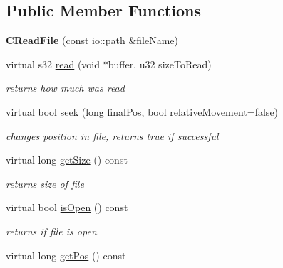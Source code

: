 \subsection*{Public Member Functions}
\begin{DoxyCompactItemize}
\item 
\hypertarget{classirr_1_1io_1_1_c_read_file_aff2d711645b645dbce0ad20aefcb1933}{{\bfseries C\-Read\-File} (const io\-::path \&file\-Name)}\label{classirr_1_1io_1_1_c_read_file_aff2d711645b645dbce0ad20aefcb1933}

\item 
\hypertarget{classirr_1_1io_1_1_c_read_file_a94aab546e88a21f5edc556ca9aea567f}{virtual s32 \hyperlink{classirr_1_1io_1_1_c_read_file_a94aab546e88a21f5edc556ca9aea567f}{read} (void $\ast$buffer, u32 size\-To\-Read)}\label{classirr_1_1io_1_1_c_read_file_a94aab546e88a21f5edc556ca9aea567f}

\begin{DoxyCompactList}\small\item\em returns how much was read \end{DoxyCompactList}\item 
virtual bool \hyperlink{classirr_1_1io_1_1_c_read_file_a56b92b55be46710dddd67e74460531e2}{seek} (long final\-Pos, bool relative\-Movement=false)
\begin{DoxyCompactList}\small\item\em changes position in file, returns true if successful \end{DoxyCompactList}\item 
\hypertarget{classirr_1_1io_1_1_c_read_file_a5df24d6a44fce05960c2b7e5887b4fc3}{virtual long \hyperlink{classirr_1_1io_1_1_c_read_file_a5df24d6a44fce05960c2b7e5887b4fc3}{get\-Size} () const }\label{classirr_1_1io_1_1_c_read_file_a5df24d6a44fce05960c2b7e5887b4fc3}

\begin{DoxyCompactList}\small\item\em returns size of file \end{DoxyCompactList}\item 
\hypertarget{classirr_1_1io_1_1_c_read_file_aad019208888e10a48e2659f1ac09e7c2}{virtual bool \hyperlink{classirr_1_1io_1_1_c_read_file_aad019208888e10a48e2659f1ac09e7c2}{is\-Open} () const }\label{classirr_1_1io_1_1_c_read_file_aad019208888e10a48e2659f1ac09e7c2}

\begin{DoxyCompactList}\small\item\em returns if file is open \end{DoxyCompactList}\item 
\hypertarget{classirr_1_1io_1_1_c_read_file_afa94d0e29a3fe3c81f1ef85d8ed12a8f}{virtual long \hyperlink{classirr_1_1io_1_1_c_read_file_afa94d0e29a3fe3c81f1ef85d8ed12a8f}{get\-Pos} () const }\label{classirr_1_1io_1_1_c_read_file_afa94d0e29a3fe3c81f1ef85d8ed12a8f}


\end{DoxyCompactItemize}
